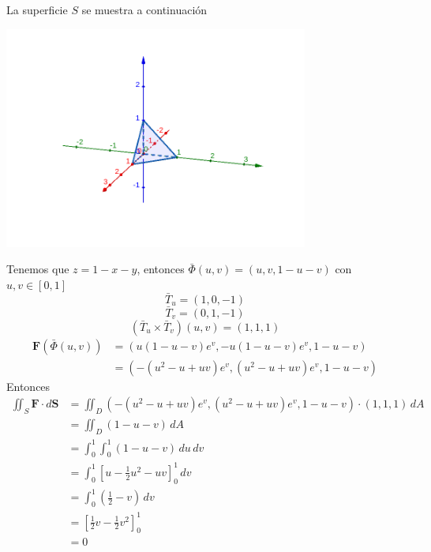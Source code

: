 \documentclass{article}
\begin{document}
\begin{enumerate}
{\begin{enumerate}
{           \color{azul}
            La superficie $S$ se muestra a continuación
            \begin{center}
                \includegraphics[width=10cm]{img/6b.png}
            \end{center}
            Tenemos que $z=1-x-y$, entonces $\bar{\Phi}(u,v) = (u,v,1-u-v)$ con $u,v\in[0,1]$
            $$ \bar{T}_u = (1,0,-1) $$
            $$ \bar{T}_v = (0,1,-1) $$
            $$ (\bar{T}_u\times\bar{T}_v)(u,v) = (1,1,1) $$
            \begin{align*}
                \mathbf{F}(\bar{\Phi}(u,v))
                &= \left(
                    u(1-u-v)e^v,
                    -u(1-u-v)e^v,
                    1-u-v
                \right)\\
                &= \left(
                    -(u^2-u+uv)e^v,
                    (u^2-u+uv)e^v,
                    1-u-v
                \right)
            \end{align*}
            Entonces
            \begin{align*}
                \iint_{S} \mathbf{F} \cdot d \mathbf{S}
                &= \iint_{D}{
                    \left(-(u^2-u+uv)e^v,(u^2-u+uv)e^v,1-u-v\right)
                    \cdot
                    (1,1,1)
                \,dA}\\[.2cm]
                &= \iint_D{
                    (1-u-v)
                \,dA}\\[.2cm]
                &= \int_{0}^{1}{
                    \int_{0}^{1}{
                        (1-u-v)
                    \,du}
                \,dv}\\[.2cm]
                &= \int_{0}^{1}{
                    \left[
                        u-\frac{1}{2}u^2-uv
                    \right]_{0}^{1}
                \,dv}\\[.2cm]
                &= \int_{0}^{1}{
                    \left(
                        \frac{1}{2}-v
                    \right)
                \,dv}\\[.2cm]
                &= \left[
                    \frac{1}{2}v-\frac{1}{2}v^2
                \right]_{0}^{1}\\
                &= 0
            \end{align*}
            }
            \end{enumerate}


}
\end{enumerate}
\end{document}
